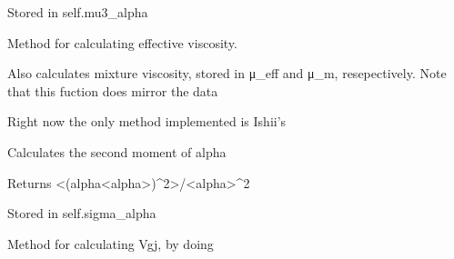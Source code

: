 \documentclass[letterpaper,10pt,english]{sphinxmanual}
\begin{document}
\begin{fulllineitems}
\begin{fulllineitems}
\sphinxAtStartPar
Stored in self.mu3\_alpha

\end{fulllineitems}


\begin{fulllineitems}
\label{\detokenize{api/MARIGOLD.Condition:MARIGOLD.Condition.calc_mu_eff}}
\pysigstartsignatures
{}
\pysigstopsignatures
\sphinxAtStartPar
Method for calculating effective viscosity.

\sphinxAtStartPar
Also calculates mixture viscosity, stored in μ\_eff and μ\_m, resepectively.
Note that this fuction does mirror the data

\sphinxAtStartPar
Right now the only method implemented is Ishii’s

\end{fulllineitems}


\begin{fulllineitems}
\label{\detokenize{api/MARIGOLD.Condition:MARIGOLD.Condition.calc_sigma_alpha}}
\pysigstartsignatures
{}
\pysigstopsignatures
\sphinxAtStartPar
Calculates the second moment of alpha

\sphinxAtStartPar
Returns \textless{}(alpha\sphinxhyphen{}\textless{}alpha\textgreater{})\textasciicircum{}2\textgreater{}/\textless{}alpha\textgreater{}\textasciicircum{}2

\sphinxAtStartPar
Stored in self.sigma\_alpha

\end{fulllineitems}


\begin{fulllineitems}
\label{\detokenize{api/MARIGOLD.Condition:MARIGOLD.Condition.calc_vgj}}
\pysigstartsignatures
{}
\pysigstopsignatures
\sphinxAtStartPar
Method for calculating Vgj, by doing


\end{fulllineitems}
\end{fulllineitems}
\end{document}
